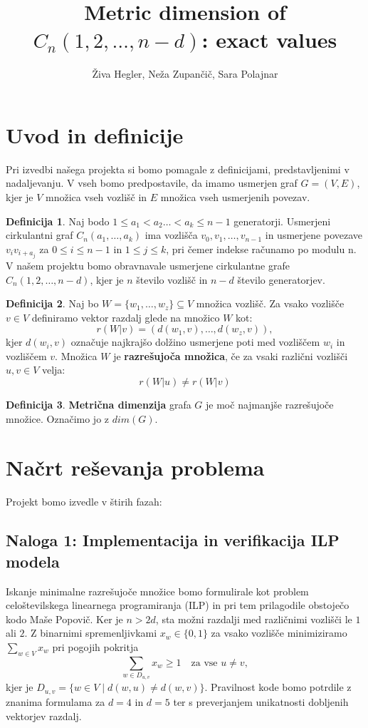 \documentclass[a4paper,12pt]{article}
\title{Metric dimension of $C_n(1, 2, \dots, n - d)$: exact values}
\author{Živa Hegler, Neža Zupančič, Sara Polajnar}
\theoremstyle{definition}
\newtheorem{definicija}{Definicija}
\begin{document}
\maketitle

\section{Uvod in definicije}
Pri izvedbi našega projekta si bomo pomagale z definicijami, predstavljenimi
v nadaljevanju. V vseh bomo predpostavile, da imamo usmerjen graf
$G = (V, E)$, kjer je $V$ množica vseh vozlišč in $E$ množica vseh usmerjenih povezav. 
\begin{definicija}
    Naj bodo $1 \leq a_1 < a_2 \ldots < a_k \leq n-1$ generatorji.
    Usmerjeni cirkulantni graf $C_n(a_1, \ldots, a_{k})$ ima vozlišča
    $v_0, v_1, \ldots, v_{n-1}$ in usmerjene povezave $v_iv_{i+a_j}$ za  
    $0 \leq i \leq n-1$ in $1 \leq j \leq k$, pri čemer indekse računamo
    po modulu n. V našem projektu bomo obravnavale usmerjene cirkulantne grafe 
    $C_n(1,2,\ldots,n-d)$, kjer je $n$ število vozlišč in $n-d$ število generatorjev.
\end{definicija}

\begin{definicija}
    Naj bo $W = \{w_1, \ldots, w_z\} \subseteq V$ množica vozlišč.
    Za vsako vozlišče $v \in V$ definiramo vektor razdalj glede na
    množico $W$ kot:
    $$
    r(W|v) = (d(w_1, v), \ldots, d(w_z, v)),
    $$
    kjer $d(w_i, v)$ označuje najkrajšo dolžino usmerjene poti med
    vozliščem $w_i$ in vozliščem $v$. Množica $W$ je \textbf{razrešujoča množica},
    če za vsaki različni vozlišči $u, v \in V$ velja:
    $$
    r(W|u) \neq r(W|v)
    $$
\end{definicija}

\begin{definicija}
    \textbf{Metrična dimenzija} grafa $G$ je moč najmanjše razrešujoče
    množice. Označimo jo z $dim(G)$.
\end{definicija}

\section{Načrt reševanja problema}

Projekt bomo izvedle v štirih fazah:

\subsection{Naloga 1: Implementacija in verifikacija ILP modela}
Iskanje minimalne razrešujoče množice bomo formulirale kot problem ce\-lo\-šte\-vil\-ske\-ga linearnega 
programiranja (ILP) in pri tem prilagodile obstoječo kodo Maše Popovič. Ker je $n > 2d$, sta možni razdalji med 
različnimi vozlišči le $1$ ali $2$. Z binarnimi spremenljivkami $x_w \in \{0, 1\}$ za vsako vozlišče minimiziramo 
$\sum_{w \in V} x_w$ pri pogojih pokritja
\[
\sum_{w \in D_{u,v}} x_w \geq 1 \quad \text{za vse } u \neq v,
\]
kjer je $D_{u,v} = \{w \in V \mid d(w, u) \neq d(w, v)\}$. Pravilnost kode bomo potrdile z znanima formulama za 
$d = 4$ in $d = 5$ ter s preverjanjem unikatnosti dobljenih vektorjev razdalj.
\end{document}
